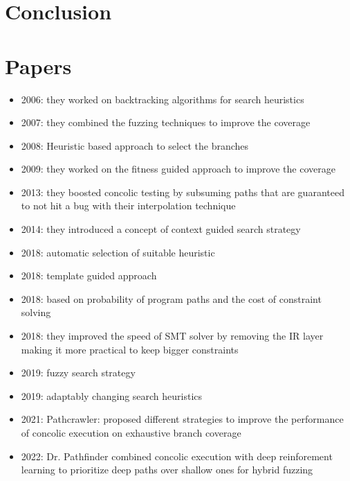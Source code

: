 \documentclass[	runningheads,
				a4paper]{llncs}
\begin{document}
\section{Conclusion}

\section{Papers}


\begin{itemize}
  \item 2006: they worked on backtracking algorithms for search heuristics \cite{yan2006backtracking}
  \item 2007: they combined the fuzzing techniques to improve the coverage \cite{majumdar2007hybrid} \cite{godefroid2007compositional} \cite{godefroid2012sage}
  \item 2008: Heuristic based approach to select the branches \cite{kousik2008heuristic}
  \item 2009: they worked on the fitness guided approach to improve the coverage \cite{xie2009fitness}
  \item 2013: they boosted concolic testing by subsuming paths that are guaranteed to not hit a bug with their interpolation technique \cite{jaffar2013boosting}
  \item 2014: they introduced a concept of context guided search strategy \cite{seo2014we}
  \item 2018: automatic selection of suitable heuristic \cite{cha2018automatically}
  \item 2018: template guided approach \cite{cha2018template}
  \item 2018: based on probability of program paths and the cost of constraint solving \cite{wang2018towards}
  \item 2018: they improved the speed of SMT solver by removing the IR layer making it more practical to keep bigger constraints \cite{yun2018qsym}
  \item 2019: fuzzy search strategy \cite{fsct2019}
  \item 2019: adaptably changing search heuristics \cite{adapt2019heuristic}
  \item 2021: Pathcrawler: proposed different strategies to improve the performance of concolic execution on exhaustive branch coverage \cite{pathcrawler2021}
  \item 2022: Dr. Pathfinder \cite{drPathfinder2022} combined concolic execution with deep reinforement learning to prioritize deep paths over shallow ones for hybrid fuzzing
\end{itemize}
\end{document}
